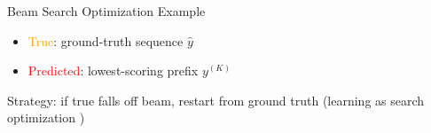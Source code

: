 \begin{frame}[fragile]{Beam Search Optimization Example}
\begin{center}
\begin{tikzpicture}[transform canvas = {scale=0.8}]
\end{tikzpicture}
  \end{center}

  \air
  \air

  \begin{itemize}
  \item \textcolor{orange}{True}: ground-truth sequence $\hat{y}$
  \item \textcolor{red}{Predicted}: lowest-scoring prefix  $y^{(K)}$
  \end{itemize}
  Strategy: if true falls off beam, restart from ground truth (learning as search optimization \cite{daume05learning})
\end{frame}

